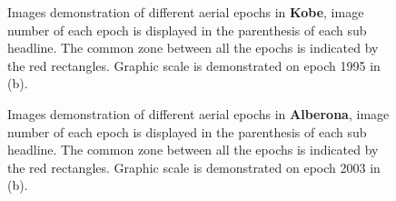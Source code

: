 \begin{figure}[htbp]
\begin{center}
{\begin{minipage}[t]{1\linewidth}
            \end{minipage}%
        }
        \caption{Images demonstration of different aerial epochs in \textbf{Kobe}, image number of each epoch is displayed in the parenthesis of each sub headline. The common zone between all the epochs is indicated by the red rectangles. Graphic scale is demonstrated on epoch 1995 in (b).}
        \label{KobeData}
    \end{center}
\end{figure} 

\begin{figure}[htbp]
	\begin{center}
		\caption{Images demonstration of different aerial epochs in \textbf{Alberona}, image number of each epoch is displayed in the parenthesis of each sub headline. The common zone between all the epochs is indicated by the red rectangles. Graphic scale is demonstrated on epoch 2003 in (b).}
		\label{AlberonaData}
	\end{center}
\end{figure} 

